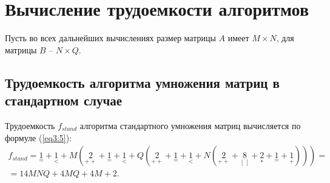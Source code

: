 \section{Вычисление трудоемкости алгоритмов}
Пусть во всех дальнейших вычислениях размер матрицы $A$ имеет $M \times N$, для матрицы $B$ -- $N \times Q$.

\subsection{Трудоемкость алгоритма умножения матриц в стандартном случае}
Трудоемкость $f_{stand}$ алгоритма стандартного умножения матриц вычисляется по формуле (\ref{eq3:5}):
\begin{multline}
	\label{eq3:5}
	f_{stand} = {\underset{=}{1}} + {\underset{<}{1}} + M({\underset{++}{2}} + {\underset{=}{1}} + {\underset{<}{1}} + Q({\underset{++}{2}} + {\underset{=}{1}} + {\underset{<}{1}} + N({\underset{++}{2}} + {\underset{[\ ]}{8}} + {\underset{*}{2}} + {\underset{=}{1}} + {\underset{+}{1}}))) = \\
	= 14MNQ + 4MQ + 4M + 2.
\end{multline}

